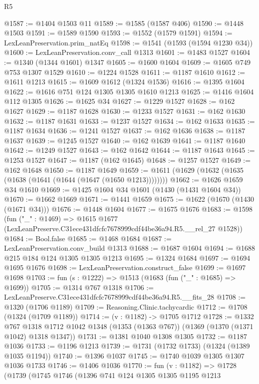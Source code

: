 \begin{lexlean}{R5}
\begin{coremodule}
@1587 := @1404 @1503 @11
@1589 := @1585 (@1587 @406)
@1590 := @1448 @1503
@1591 := @1589 @1590
@1593 := @1552 (@1579 @1591)
@1594 := LexLeanPreservation.prim_natEq
@1598 := @1541 (@1593 (@1594 @1230 @34))
@1600 := LexLeanPreservation.conv_call @1313
@1601 := @1483 @1527
@1604 := @1340 (@1344 @1601) @1347
@1605 := @1600 @1604
@1609 := @1605 @749 @753 @1307 @1529
@1610 := @1224 @1528
@1611 := @1187 @1610
@1612 := @1611 @1213
@1615 := @1609 @1612 (@1324 @1536)
@1616 := @1395 @1604
@1622 := @1616 @751 @124 @1305 @1305 @1610 @1213
@1625 := @1416 @1604 @112 @1305
@1626 := @1625 @34
@1627 := @1229 @1527
@1628 := @162 @1627
@1629 := @1187 @1628
@1630 := @1233 @1527
@1631 := @162 @1630
@1632 := @1187 @1631
@1633 := @1237 @1527
@1634 := @162 @1633
@1635 := @1187 @1634
@1636 := @1241 @1527
@1637 := @162 @1636
@1638 := @1187 @1637
@1639 := @1245 @1527
@1640 := @162 @1639
@1641 := @1187 @1640
@1642 := @1249 @1527
@1643 := @162 @1642
@1644 := @1187 @1643
@1645 := @1253 @1527
@1647 := @1187 (@162 @1645)
@1648 := @1257 @1527
@1649 := @162 @1648
@1650 := @1187 @1649
@1659 := @1611 (@1629 (@1632 (@1635 (@1638 (@1641 (@1644 (@1647 (@1650 @1213))))))))
@1662 := @1626 @1659 @34 @1610
@1669 := @1425 @1604 @34 @1601 (@1430 (@1431 @1604 @34))
@1670 := @1662 @1669
@1671 := @1441 @1659
@1675 := @1622 (@1670 (@1430 (@1671 @34)))
@1676 := @1448 @1604
@1677 := @1675 @1676
@1683 := @1598
    (fun ("_" : @1469) =>
    @1615 @1677 (LexLeanPreserve.C31ece431dfcfc7678999cdf44be36a94.R5.__rel_27 @1528))
@1684 := Bool.false
@1685 := @1468 @1684
@1687 := LexLeanPreservation.conv_build @1313
@1688 := @1687 @1604
@1694 := @1688 @215 @184 @124 @1305 @1305 @1213
@1695 := @1324 @1684
@1697 := @1694 @1695 @1676
@1698 := LexLeanPreservation.construct_false
@1699 := @1697 @1698
@1703 := fun (s : @1222) => @1513 (@1683 (fun ("_" : @1685) => @1699))
@1705 := @1314 @767 @1318
@1706 := LexLeanPreserve.C31ece431dfcfc7678999cdf44be36a94.R5.__fits_28
@1708 := @1320 (@1706 @1189)
@1709 := Reasoning.Clinic.tachycardic
@1712 := @1708 (@1324 (@1709 @1189))
@1714 := (v : @1182) -> @1705 @1712
@1728 := @1332
    @767
    @1318
    @1712
    @1042
    @1348
    (@1353 (@1363 @767))
    (@1369 (@1370 (@1371 @1042) @1318 @1347))
@1731 := @1381 @1040 @1308 @1305
@1732 := @1187 @1036
@1733 := @1196 @1213
@1739 := @1731 (@1732 @1733) (@1324 (@1389 @1035 @1194))
@1740 := @1396 @1037
@1745 := @1740 @1039 @1305 @1307 @1036 @1733
@1746 := @1406 @1036
@1770 := fun (v : @1182) =>
  @1728
    (@1739
      (@1745
        @1746
        (@1396
          @741
          @124
          @1305
          @1305
          @1195
          @1213

\end{coremodule}
\end{lexlean}
